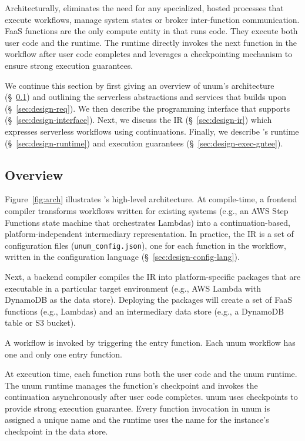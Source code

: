 Architecturally, \name{} eliminates the need for any specialized, hosted
processes that execute workflows, manage system states or broker
inter-function communication. FaaS functions are the only compute entity in
\name{} that runs code. They execute both user code and the \name{} runtime. The
\name{} runtime directly invokes the next function in the workflow after user
code completes and leverages a checkpointing mechanism to ensure strong
execution guarantees.

We continue this section by first giving an overview of unum's architecture
(\S~\ref{sec:design-overview}) and outlining the serverless abstractions and
services that \name{} builds upon (\S~\ref{sec:design-req}). We then
describe the programming interface that \name{} supports
(\S~\ref{sec:design-interface}). Next, we discuss the \name{} IR
(\S~\ref{sec:design-ir}) which expresses serverless workflows using
continuations. Finally, we describe \name{}'s runtime
(\S~\ref{sec:design-runtime}) and execution guarantees
(\S~\ref{sec:design-exec-gntee}).

\subsection{Overview}\label{sec:design-overview}

Figure~\ref{fig:arch} illustrates \name{}'s high-level architecture. At
compile-time, a frontend compiler transforms workflows written for existing
systems (e.g., an AWS Step Functions state machine that orchestrates Lambdas)
into a continuation-based, platform-independent intermediary representation.
In practice, the IR is a set of configuration files
(\texttt{unum\_config.json}), one for each function in the workflow, written
in the \name{} configuration language (\S~\ref{sec:design-config-lang}).

Next, a backend compiler compiles the IR into platform-specific packages that
are executable in a particular target environment (e.g., AWS Lambda with
DynamoDB as the data store). Deploying the packages will create a set of FaaS
functions (e.g., Lambdas) and an intermediary data store (e.g., a DynamoDB
table or S3 bucket).

A workflow is invoked by triggering the entry function. Each unum workflow has
one and only one entry function.

At execution time, each function runs both the user code and the unum runtime.
The unum runtime manages the function's checkpoint and invokes the
continuation asynchronously after user code completes. unum uses checkpoints
to provide strong execution guarantee. Every function invocation in unum is
assigned a unique name and the runtime uses the name for the instance's
checkpoint in the data store.

